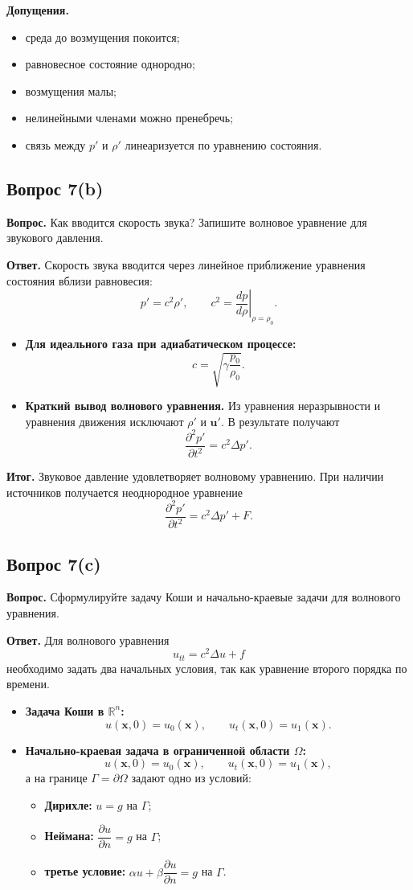 \documentclass[a4paper,12pt]{article}
\newcommand{\R}{\mathbb{R}}
\newcommand{\Question}[2]{\subsection*{Вопрос #1}\textbf{Вопрос.} #2}
\newcommand{\Answer}{\textbf{Ответ.}}
\begin{document}
\textbf{Допущения.}
\begin{itemize}
  \item среда до возмущения покоится;
  \item равновесное состояние однородно;
  \item возмущения малы;
  \item нелинейными членами можно пренебречь;
  \item связь между $p'$ и $\rho'$ линеаризуется по уравнению состояния.
\end{itemize}

\Question{7(b)}{Как вводится скорость звука? Запишите волновое уравнение для звукового давления.}

\Answer
Скорость звука вводится через линейное приближение уравнения состояния вблизи равновесия:
\[
p'=c^2\rho',
\qquad
c^2=\left.\frac{dp}{d\rho}\right|_{\rho=\rho_0}.
\]

\begin{itemize}
  \item \textbf{Для идеального газа при адиабатическом процессе:}
  \[
  c=\sqrt{\gamma\frac{p_0}{\rho_0}}.
  \]

  \item \textbf{Краткий вывод волнового уравнения.} Из уравнения неразрывности и уравнения движения исключают $\rho'$ и $\mathbf{u}'$. В результате получают
  \[
  \frac{\partial^2 p'}{\partial t^2}=c^2\Delta p'.
  \]
\end{itemize}

\textbf{Итог.} Звуковое давление удовлетворяет волновому уравнению. При наличии источников получается неоднородное уравнение
\[
\frac{\partial^2 p'}{\partial t^2}=c^2\Delta p'+F.
\]

\Question{7(c)}{Сформулируйте задачу Коши и начально-краевые задачи для волнового уравнения.}

\Answer
Для волнового уравнения
\[
u_{tt}=c^2\Delta u+f
\]
необходимо задать два начальных условия, так как уравнение второго порядка по времени.

\begin{itemize}
  \item \textbf{Задача Коши в $\R^n$:}
  \[
  u(\mathbf{x},0)=u_0(\mathbf{x}), \qquad
  u_t(\mathbf{x},0)=u_1(\mathbf{x}).
  \]

  \item \textbf{Начально-краевая задача в ограниченной области $\Omega$:}
  \[
  u(\mathbf{x},0)=u_0(\mathbf{x}), \qquad
  u_t(\mathbf{x},0)=u_1(\mathbf{x}),
  \]
  а на границе $\Gamma=\partial\Omega$ задают одно из условий:
  \begin{itemize}
    \item \textbf{Дирихле:} $u=g$ на $\Gamma$;
    \item \textbf{Неймана:} $\dfrac{\partial u}{\partial n}=g$ на $\Gamma$;
    \item \textbf{третье условие:} $\alpha u+\beta\dfrac{\partial u}{\partial n}=g$ на $\Gamma$.
  \end{itemize}
\end{itemize}
\end{document}
